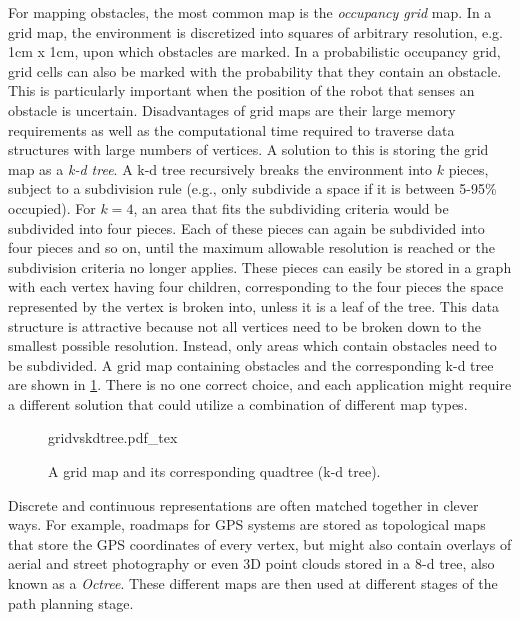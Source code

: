 For mapping obstacles, the most common map is the \textsl{occupancy grid} map. In a grid map, the environment is discretized into squares of arbitrary resolution, e.g. 1cm x 1cm, upon which obstacles are marked. In a probabilistic occupancy grid, grid cells can also be marked with the probability that they contain an obstacle. This is particularly important when the position of the robot that senses an obstacle is uncertain. Disadvantages of grid maps are their large memory requirements as well as the computational time required to traverse data structures with large numbers of vertices. A solution to this is storing the grid map as a \textsl{k-d tree}. A k-d tree recursively breaks the environment into $k$ pieces, subject to a subdivision rule (e.g., only subdivide a space if it is between 5-95\% occupied). For $k=4$, an area that fits the subdividing criteria would be subdivided into four pieces. Each of these pieces can again be subdivided into four pieces and so on, until the maximum allowable resolution is reached or the subdivision criteria no longer applies. These pieces can easily be stored in a graph with each vertex having four children, corresponding to the four pieces the space represented by the vertex is broken into, unless it is a leaf of the tree. This data structure is attractive because not all vertices need to be broken down to the smallest possible resolution. Instead, only areas which contain obstacles need to be subdivided. A grid map containing obstacles and the corresponding k-d tree are shown in \cref{fig:gridvskdtree}. There is no one correct choice, and each application might require a different solution that could utilize a combination of different map types.

\begin{figure}
    \centering
    \def\svgwidth{\textwidth}
    {gridvskdtree.pdf_tex}
    \caption{A grid map and its corresponding quadtree (k-d tree).\label{fig:gridvskdtree}}
\end{figure}

Discrete and continuous representations are often matched together in clever ways. For example, roadmaps for GPS systems are stored as topological maps that store the GPS coordinates of every vertex, but might also contain overlays of aerial and street photography or even 3D point clouds stored in a 8-d tree, also known as a \textsl{Octree}. These different maps are then used at different stages of the path planning stage.


